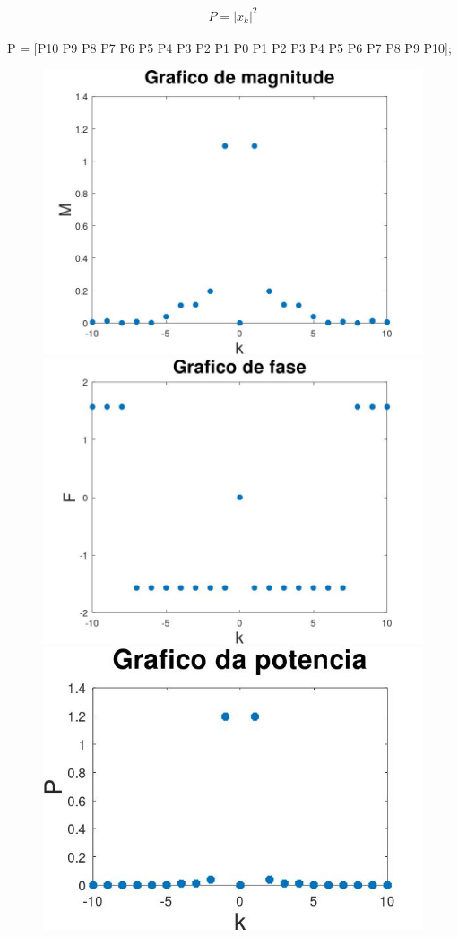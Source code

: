 \documentclass{article}
\begin{document}
\begin{align*}
    P = |x_{k}|^2
\end{align*}

P = [P10 P9 P8 P7 P6 P5 P4 P3 P2 P1 P0 P1 P2 P3 P4 P5 P6 P7 P8 P9 P10];

\vspace{\baselineskip}

\begin{figure}[h!]
    \includegraphics[scale=0.3]{plot4dm}
    \includegraphics[scale=0.3]{plot4df}
    \includegraphics[scale=0.43]{plot4dp}

\end{figure}
\end{document}
